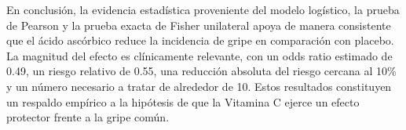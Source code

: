 En conclusión, la evidencia estadística proveniente del modelo logístico, la prueba de Pearson y la prueba exacta de Fisher unilateral apoya de manera consistente que el ácido ascórbico reduce la incidencia de gripe en comparación con placebo. La magnitud del efecto es clínicamente relevante, con un odds ratio estimado de 0.49, un riesgo relativo de 0.55, una reducción absoluta del riesgo cercana al 10\% y un número necesario a tratar de alrededor de 10. Estos resultados constituyen un respaldo empírico a la hipótesis de que la Vitamina C ejerce un efecto protector frente a la gripe común.

\clearpage